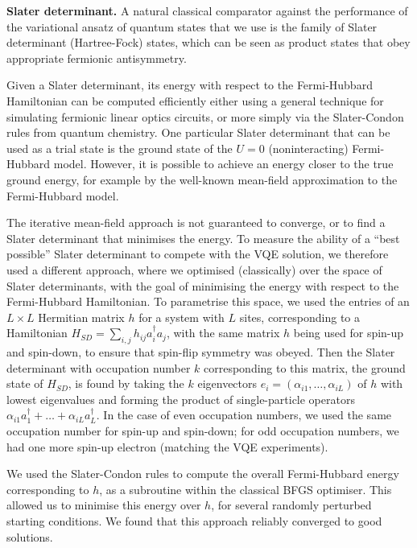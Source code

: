 \documentclass[aps,prb,twoside,superscriptaddress,longbibliography,nofootinbib,floatfix, notitlepage,twocolumn]{revtex4-1}
\begin{document}
{\textbf{Slater determinant.} A natural classical comparator against the performance of the variational ansatz of quantum states that we use is the family of Slater determinant (Hartree-Fock) states, which can be seen as product states that obey appropriate fermionic antisymmetry.

Given a Slater determinant, its energy with respect to the Fermi-Hubbard Hamiltonian can be computed efficiently either using a general technique for simulating fermionic linear optics circuits\cite{terhal02}, or more simply via the Slater-Condon rules from quantum chemistry. One particular Slater determinant that  can be used as a trial state is the ground state of the $U=0$ (noninteracting) Fermi-Hubbard model. However, it is possible to achieve an energy closer to the true ground energy, for example by the well-known mean-field approximation to the Fermi-Hubbard model\cite{kadanoff09}.

The iterative mean-field approach is not guaranteed to converge, or to find a Slater determinant that minimises the energy. To measure the ability of a ``best possible'' Slater determinant  to compete with the VQE solution, we therefore used a different approach, where we optimised (classically) over the space of Slater determinants, with the goal of minimising the energy with respect to the Fermi-Hubbard Hamiltonian. To parametrise this space, we used the entries of an $L\times L$ Hermitian matrix $h$ for a system with $L$ sites, corresponding to a Hamiltonian $H_{SD} = \sum_{i,j} h_{ij} a_i^\dag a_j$, with the same matrix $h$ being used for spin-up and spin-down, to ensure that spin-flip symmetry was obeyed. Then the Slater determinant with occupation number $k$ corresponding to this matrix, the ground state of $H_{SD}$, is found by taking the $k$ eigenvectors $e_i = (\alpha_{i1},\dots,\alpha_{iL})$ of $h$ with lowest eigenvalues and forming the product of single-particle operators $\alpha_{i1} a^\dag_1 + \dots + \alpha_{iL} a^\dag_L$. In the case of even occupation numbers, we used the same occupation number for spin-up and spin-down; for odd occupation numbers, we had one more spin-up electron (matching the VQE experiments).

We used the Slater-Condon rules to compute the overall Fermi-Hubbard energy corresponding to $h$, as a subroutine within the classical BFGS optimiser. This allowed us to minimise this energy over $h$, for several randomly perturbed starting conditions. We found that this approach reliably converged to good solutions.

}
\end{document}
